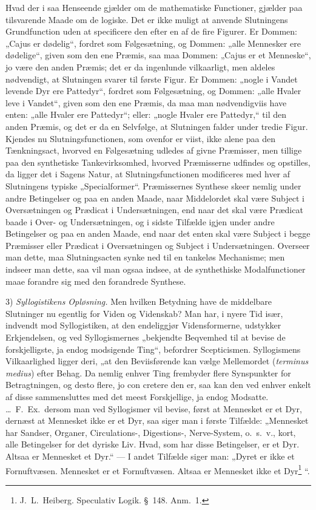 \documentclass[12pt]{book}
\newcommand{\opage}[1]{\marginnote{\footnotesize\textit{[#1]}}}
\begin{document}
Hvad der i saa Henseende gjælder om de mathematiske Functioner, gjælder paa tilsvarende Maade om de logiske. Det er ikke muligt at anvende Slutningens Grundfunction uden at specificere den efter en af de fire Figurer. Er Dommen: „Cajus er dødelig“, fordret som Følgesætning, og Dommen: „alle Mennesker ere dødelige“, given som den ene Præmis, saa maa Dommen: „Cajus er et Menneske“, jo være den anden Præmis; det er da ingenlunde vilkaarligt,
\opage{324}men aldeles nødvendigt, at Slutningen svarer til første Figur. Er Dommen: „nogle i Vandet levende Dyr ere Pattedyr“, fordret som Følgesætning, og Dommen: „alle Hvaler leve i Vandet“, given som den ene Præmis, da maa man nødvendigviis have enten: „alle Hvaler ere Pattedyr“; eller: „nogle Hvaler ere Pattedyr,“ til den anden Præmis, og det er da en Selvfølge, at Slutningen falder under tredie Figur. Kjendes nu Slutningsfunctionen, som ovenfor er viist, ikke alene paa den Tænkningsact, hvorved en Følgesætning udledes af givne Præmisser, men tillige paa den synthetiske Tankevirksomhed, hvorved Præmisserne udfindes og opstilles, da ligger det i Sagens Natur, at Slutningsfunctionen modificeres med hver af Slutningens typiske „Specialformer“. Præmissernes Synthese skeer nemlig under andre Betingelser og paa en anden Maade, naar Middelordet skal være Subject i Oversætningen og Prædicat i Undersætningen, end naar det skal være Prædicat baade i Over- og Undersætningen, og i sidste Tilfælde igjen under andre Betingelser og paa en anden Maade, end naar det enten skal være Subject i begge Præmisser eller Prædicat i Oversætningen og Subject i Undersætningen. Overseer man dette, maa Slutningsacten synke ned til en tankeløs Mechanisme; men indseer man dette, saa vil man ogsaa indsee, at de synthethiske Modalfunctioner maae forandre sig med den forandrede Synthese. %

3) \emph{Syllogistikens Opløsning.} Men hvilken Betydning have de middelbare Slutninger nu egentlig for Viden og Videnskab? Man har, i nyere Tid især, indvendt mod Syllogistiken, at den endeliggjør Vidensformerne, udstykker Erkjendelsen, og ved Syllogismernes „bekjendte Beqvemhed til at bevise de forskjelligste, ja endog modsigende Ting“, befordrer Scepticismen. Syllogismens Vilkaarlighed ligger deri, „at den Beviisførende kan vælge Mellemordet (\textit{terminus medius}) efter Behag. Da nemlig enhver Ting frembyder flere Synspunkter for Betragtningen, og desto flere, jo con%
\opage{325}cretere den er, saa kan den ved enhver enkelt af disse sammensluttes med det meest Forskjellige, ja endog Modsatte. \dots\ F.\ Ex.\ dersom man ved Syllogismer vil bevise, først at Mennesket er et Dyr, dernæst at Mennesket ikke er et Dyr, saa siger man i første Tilfælde: „Mennesket har Sandser, Organer, Circulations-, Digestions-, Nerve-System, o.\ s.\ v., kort, alle Betingelser for det dyriske Liv. Hvad, som har disse Betingelser, er et Dyr. Altsaa er Mennesket et Dyr.“ --- I andet Tilfælde siger man: „Dyret er ikke et Fornuftvæsen. Mennesket er et Fornuftvæsen. Altsaa er Mennesket ikke et Dyr\footnote{J.\ L.\ Heiberg. Speculativ Logik. §~148. Anm.~1.}%
“.
\end{document}
